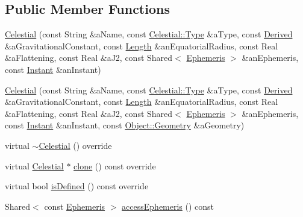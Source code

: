 \subsection*{Public Member Functions}
\begin{DoxyCompactItemize}
\item 
\hyperlink{classlibrary_1_1physics_1_1env_1_1obj_1_1_celestial_a86c385e43005598c96778d41cff5639e}{Celestial} (const String \&a\+Name, const \hyperlink{classlibrary_1_1physics_1_1env_1_1obj_1_1_celestial_aab1f58aa727e639288d65f3d33c4f245}{Celestial\+::\+Type} \&a\+Type, const \hyperlink{classlibrary_1_1physics_1_1units_1_1_derived}{Derived} \&a\+Gravitational\+Constant, const \hyperlink{classlibrary_1_1physics_1_1units_1_1_length}{Length} \&an\+Equatorial\+Radius, const Real \&a\+Flattening, const Real \&a\+J2, const Shared$<$ \hyperlink{classlibrary_1_1physics_1_1env_1_1_ephemeris}{Ephemeris} $>$ \&an\+Ephemeris, const \hyperlink{classlibrary_1_1physics_1_1time_1_1_instant}{Instant} \&an\+Instant)
\item 
\hyperlink{classlibrary_1_1physics_1_1env_1_1obj_1_1_celestial_a7ee6c55653113c71bf79d8c0d64878d7}{Celestial} (const String \&a\+Name, const \hyperlink{classlibrary_1_1physics_1_1env_1_1obj_1_1_celestial_aab1f58aa727e639288d65f3d33c4f245}{Celestial\+::\+Type} \&a\+Type, const \hyperlink{classlibrary_1_1physics_1_1units_1_1_derived}{Derived} \&a\+Gravitational\+Constant, const \hyperlink{classlibrary_1_1physics_1_1units_1_1_length}{Length} \&an\+Equatorial\+Radius, const Real \&a\+Flattening, const Real \&a\+J2, const Shared$<$ \hyperlink{classlibrary_1_1physics_1_1env_1_1_ephemeris}{Ephemeris} $>$ \&an\+Ephemeris, const \hyperlink{classlibrary_1_1physics_1_1time_1_1_instant}{Instant} \&an\+Instant, const \hyperlink{classlibrary_1_1physics_1_1env_1_1_object_abdf50733c7ad97327fb64edca5670f13}{Object\+::\+Geometry} \&a\+Geometry)
\item 
virtual \hyperlink{classlibrary_1_1physics_1_1env_1_1obj_1_1_celestial_a508a59c34ac23a582f2fed6003c4c907}{$\sim$\+Celestial} () override
\item 
virtual \hyperlink{classlibrary_1_1physics_1_1env_1_1obj_1_1_celestial}{Celestial} $\ast$ \hyperlink{classlibrary_1_1physics_1_1env_1_1obj_1_1_celestial_aaf8aa41a0ff9336eba62c07e3c27f82d}{clone} () const override
\item 
virtual bool \hyperlink{classlibrary_1_1physics_1_1env_1_1obj_1_1_celestial_a2b16a76f609891450356457de13c26d8}{is\+Defined} () const override
\item 
Shared$<$ const \hyperlink{classlibrary_1_1physics_1_1env_1_1_ephemeris}{Ephemeris} $>$ \hyperlink{classlibrary_1_1physics_1_1env_1_1obj_1_1_celestial_ab56fff3f2f1508dee79fa7410d67e300}{access\+Ephemeris} () const

\end{DoxyCompactItemize}
